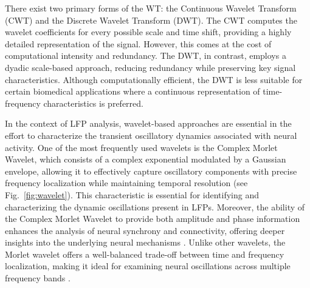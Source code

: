 \documentclass{article}
\begin{document}
There exist two primary forms of the WT: the Continuous Wavelet Transform (CWT) and the Discrete Wavelet Transform (DWT). The CWT computes the wavelet coefficients for every possible scale and time shift, providing a highly detailed representation of the signal. However, this comes at the cost of computational intensity and redundancy. The DWT, in contrast, employs a dyadic scale-based approach, reducing redundancy while preserving key signal characteristics. Although computationally efficient, the DWT is less suitable for certain biomedical applications where a continuous representation of time-frequency characteristics is preferred.

In the context of LFP analysis, wavelet-based approaches are essential in the effort to characterize the transient oscillatory dynamics associated with neural activity. One of the most frequently used wavelets is the Complex Morlet Wavelet, which consists of a complex exponential modulated by a Gaussian envelope, allowing it to effectively capture oscillatory components with precise frequency localization while maintaining temporal resolution (see Fig.~\ref{fig:wavelet}). This characteristic is essential for identifying and characterizing the dynamic oscillations present in LFPs. Moreover, the ability of the Complex Morlet Wavelet to provide both amplitude and phase information enhances the analysis of neural synchrony and connectivity, offering deeper insights into the underlying neural mechanisms \cite{lopour2013}. Unlike other wavelets, the Morlet wavelet offers a well-balanced trade-off between time and frequency localization, making it ideal for examining neural oscillations across multiple frequency bands \cite{cohen2019}.
\end{document}
